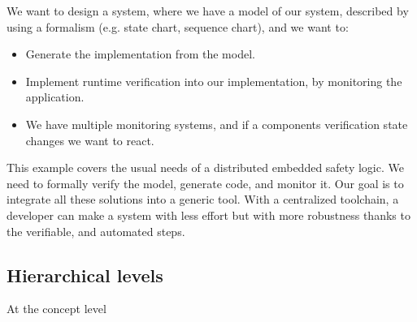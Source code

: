 We want to design a system, where we have a model of our system, described by using a formalism (e.g. state chart, sequence chart), and we want to:
\begin{itemize}
	\item Generate the implementation from the model.
	\item Implement runtime verification into our implementation, by monitoring the application.
	\item We have multiple monitoring systems, and if a components verification state changes we want to react.
\end{itemize}

This example covers the usual needs of a distributed embedded safety logic. We need to formally verify the model, generate code, and monitor it. Our goal is to integrate all these solutions into a generic tool. With a centralized toolchain, a developer can make a system with less effort but with more robustness thanks to the verifiable, and automated steps.
\\[1ex]

\subsection{Hierarchical levels}

At the concept level